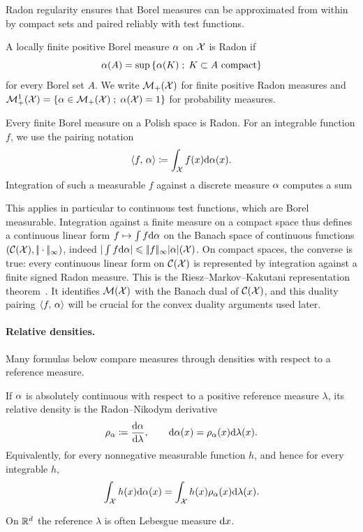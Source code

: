 Radon regularity ensures that Borel measures can be approximated from within by compact sets and paired reliably with test functions.
\begin{defn}\label{def-radon-probability-measures}
	A locally finite positive Borel measure $\alpha$ on $\mathcal{X}$ is Radon if
	\[
		\alpha(A)=\sup\left\{ \alpha(K) \;;\; K\subset A\text{ compact} \right\}
	\]
	for every Borel set $A$. We write $\mathcal{M}_+(\mathcal{X})$ for finite positive Radon measures and
	$\mathcal{M}_+^1(\mathcal{X})=\left\{ \alpha\in\mathcal{M}_+(\mathcal{X}) \;;\; \alpha(\mathcal{X})=1 \right\}$ for probability measures.
\end{defn}
Every finite Borel measure on a Polish space is Radon.
For an integrable function $f$, we use the pairing notation
\[
	\langle f,\,\alpha\rangle\coloneqq\int_{\mathcal{X}} f(x)\mathrm{d}\alpha(x).
\]
Integration of such a measurable $f$ against a discrete measure $\alpha$ computes a sum


This applies in particular to continuous test functions, which are Borel measurable.
%
Integration against a finite measure on a compact space thus defines a continuous linear form $f \mapsto \int f \mathrm{d}\alpha$ on the Banach space of continuous functions $(\mathcal{C}(\mathcal{X}),|\!| \cdot |\!|_\infty)$, indeed $|\int f \mathrm{d}\alpha| \leqslant |\!| f |\!|_\infty |\alpha|(\mathcal{X})$. On compact spaces, the converse is true: every continuous linear form on $\mathcal{C}(\mathcal{X})$ is represented by integration against a finite signed Radon measure. This is the Riesz--Markov--Kakutani representation theorem~\cite{rudin1987realcomplex,bogachev2007measure}. It identifies $\mathcal{M}(\mathcal{X})$ with the Banach dual of $\mathcal{C}(\mathcal{X})$, and this duality pairing $\langle f,\,\alpha\rangle$ will be crucial for the convex duality arguments used later.

\paragraph{Relative densities.}

Many formulas below compare measures through densities with respect to a reference measure.

\begin{defn}\label{def-relative-density}
	If $\alpha$ is absolutely continuous with respect to a positive reference measure $\lambda$, its relative density is the Radon--Nikodym derivative
	\[
		\rho_{\alpha}\coloneqq\frac{\mathrm{d}\alpha}{\mathrm{d}\lambda},
		\qquad
		\mathrm{d}\alpha(x)=\rho_{\alpha}(x)\mathrm{d}\lambda(x).
	\]
	Equivalently, for every nonnegative measurable function $h$, and hence for every integrable $h$,
	\[
		\int_{\mathcal{X}} h(x) \mathrm{d}\alpha(x) = \int_{\mathcal{X}} h(x) \rho_{\alpha}(x) \mathrm{d}\lambda(x).
	\]
\end{defn}
On $\mathbb{R}^d$ the reference $\lambda$ is often Lebesgue measure $\mathrm{d} x$.

